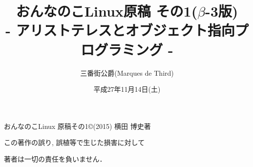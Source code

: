 \documentclass[uplatex,b5j,8pt, twocolumn]{jsarticle}
\title{おんなのこLinux原稿 その1($\beta$-3版)\\
{- アリストテレスとオブジェクト指向プログラミング -}}
\author{三番街公爵(Marques de Third)}
\date{
平成27年11月14日(土) 
 }
\begin{document}
\maketitle

おんなのこLinux 原稿その1\copyright (2015) 横田 博史著\par

この著作の誤り, 誤植等で生じた損害に対して

著者は一切の責任を負いません．

\newpage
\setcounter{page}{1}


\end{document}
